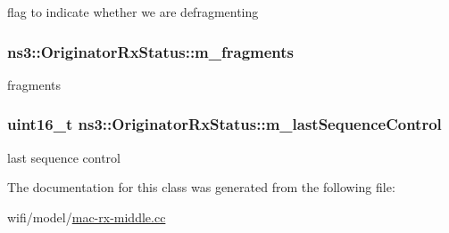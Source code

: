 flag to indicate whether we are defragmenting 

\subsubsection[{\texorpdfstring{m\+\_\+fragments}{m_fragments}}]{ ns3\+::\+Originator\+Rx\+Status\+::m\+\_\+fragments\hspace{0.3cm}{\ttfamily [private]}}\hypertarget{classns3_1_1OriginatorRxStatus_a31ec8a9507d8619d38ef3a321a18d8bc}{}\label{classns3_1_1OriginatorRxStatus_a31ec8a9507d8619d38ef3a321a18d8bc}


fragments 

\subsubsection[{\texorpdfstring{m\+\_\+last\+Sequence\+Control}{m_lastSequenceControl}}]{\setlength{\rightskip}{0pt plus 5cm}uint16\+\_\+t ns3\+::\+Originator\+Rx\+Status\+::m\+\_\+last\+Sequence\+Control\hspace{0.3cm}{\ttfamily [private]}}\hypertarget{classns3_1_1OriginatorRxStatus_a38d5f24b9ed9ca5760a66c349c83977c}{}\label{classns3_1_1OriginatorRxStatus_a38d5f24b9ed9ca5760a66c349c83977c}


last sequence control 



The documentation for this class was generated from the following file\+:\begin{DoxyCompactItemize}
\item 
wifi/model/\hyperlink{mac-rx-middle_8cc}{mac-\/rx-\/middle.\+cc}\end{DoxyCompactItemize}
